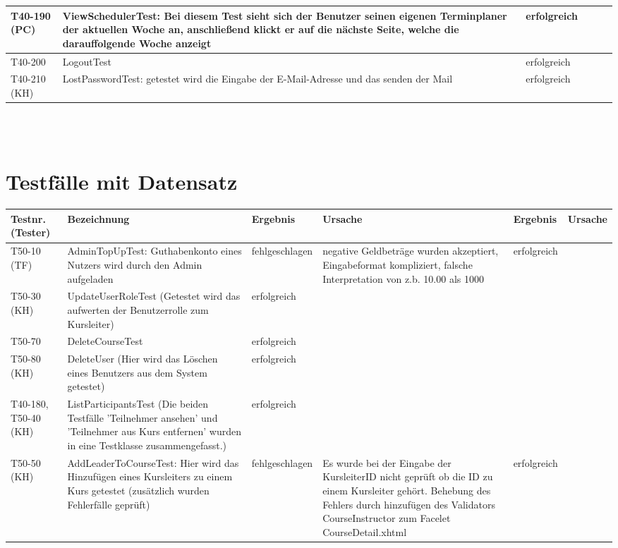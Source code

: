 \begin{landscape}
\begin{tabular}{|p{2.0cm} |p{5.0cm}|p{3.0cm}|p{5.0cm}|p{4.0cm}|p{4.0cm}|}
			
			\hline T40-190 (PC) & ViewSchedulerTest: Bei diesem Test sieht sich der Benutzer seinen eigenen Terminplaner der aktuellen Woche an, anschließend klickt er auf die nächste Seite, welche die darauffolgende Woche anzeigt & erfolgreich & & & \\
			
			\hline T40-200  & LogoutTest & erfolgreich &        &         &       \\
			\hline T40-210 (KH) & LostPasswordTest: getestet wird die Eingabe der E-Mail-Adresse und das senden der Mail & erfolgreich &        &         &       \\
			\hline 
		\end{tabular} \ \\
		\ \\
			
	\section{Testfälle mit Datensatz}	
		\begin{tabular}{|p{2.0cm} |p{5.0cm}|p{3.0cm}|p{5.0cm}|p{4.0cm}|p{4.0cm}|}
			\hline \textbf{Testnr. (Tester)} & \textbf{Bezeichnung} & \textbf{Ergebnis} & \textbf{Ursache} & \textbf{Ergebnis} & \textbf{Ursache} \\
			
			\hline  T50-10 (TF) & AdminTopUpTest: Guthabenkonto eines Nutzers wird durch den Admin aufgeladen &     fehlgeschlagen     & negative Geldbeträge wurden akzeptiert,  Eingabeformat kompliziert, falsche Interpretation von z.b. 10.00 als 1000       &    erfolgreich     &       \\	
			\hline  T50-30 (KH)     &  UpdateUserRoleTest (Getestet wird das aufwerten der Benutzerrolle zum Kursleiter)    &    erfolgreich      &        &         &       \\
			
			\hline T50-70 & DeleteCourseTest & erfolgreich &        &         &       \\
			\hline T50-80 (KH)   &   DeleteUser (Hier wird das Löschen eines Benutzers aus dem System getestet)       &    erfolgreich      &        &         &       \\
			
			\hline  T40-180, T50-40 (KH) & ListParticipantsTest (Die beiden Testfälle 'Teilnehmer ansehen' und 'Teilnehmer aus Kurs entfernen' wurden in eine Testklasse zusammengefasst.) &     erfolgreich     &        &         &       \\
			\hline  T50-50 (KH) &  AddLeaderToCourseTest: Hier wird das Hinzufügen eines Kursleiters zu einem Kurs getestet (zusätzlich wurden Fehlerfälle geprüft) &  fehlgeschlagen & Es wurde bei der Eingabe der KursleiterID nicht geprüft ob die ID zu einem Kursleiter gehört. Behebung des Fehlers durch hinzufügen des Validators CourseInstructor zum Facelet CourseDetail.xhtml  &  erfolgreich       &       \\
			
			\hline 
		\end{tabular} 
		
	
\end{landscape}